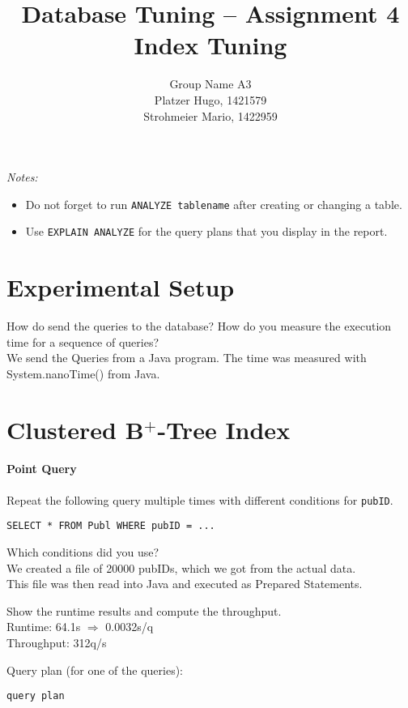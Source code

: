 \documentclass[11pt]{scrartcl}
\title{
  \textbf{\large Database Tuning -- Assignment 4}\\
  Index Tuning
}
\author{
 Group Name A3\\
 \large Platzer Hugo, 1421579 \\
 \large Strohmeier Mario, 1422959 \\
}
\begin{document}
\maketitle

\noindent
{\it Notes:}
\begin{itemize}\itemsep=0pt
\item Do not forget to run {\tt ANALYZE tablename} after creating or
  changing a table.
\item Use {\tt EXPLAIN ANALYZE} for the query plans that you display in the report.
\end{itemize}


\section{Experimental Setup}

How do send the queries to the database? How do you measure the
execution time for a sequence of queries?\\
We send the Queries from a Java program. The time was measured with System.nanoTime() from Java.

\section{Clustered B$^+$-Tree Index}

\paragraph{Point Query}

Repeat the following query multiple times with different conditions for {\tt pubID}.

{\small
\begin{verbatim}
SELECT * FROM Publ WHERE pubID = ...
\end{verbatim}
}

\noindent
Which conditions did you use?\\
We created a file of 20000 pubIDs, which we got from the actual data.\\
This file was then read into Java and executed as Prepared Statements.

\smallskip\noindent
Show the runtime results and compute the throughput.\\
Runtime: 64.1s $\Rightarrow$ 0.0032s/q\\
Throughput: 312q/s

\smallskip\noindent
Query plan (for one of the queries):
{\small
\begin{verbatim}
query plan
\end{verbatim}
}
\end{document}
